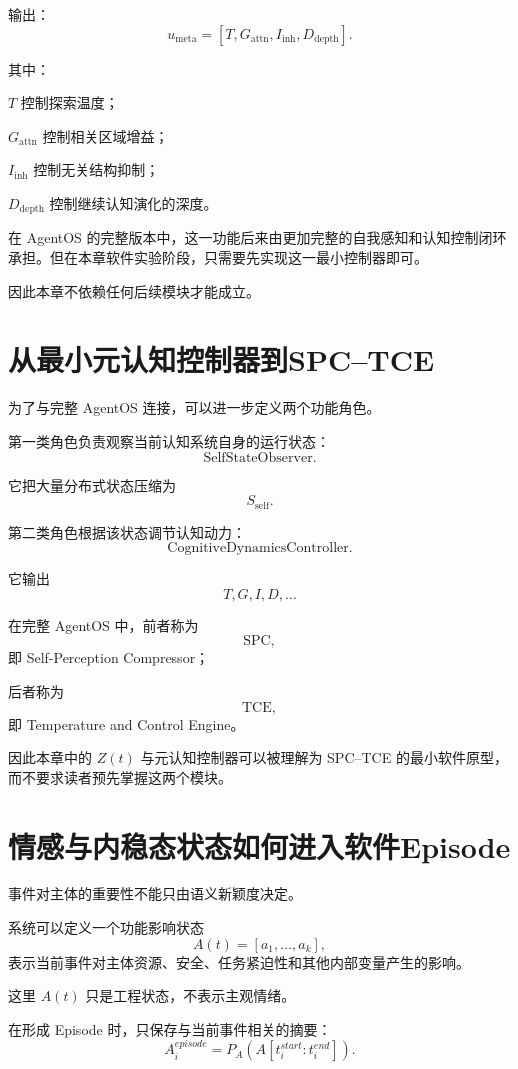 输出：
\[
u_{\mathrm{meta}}
=
[
T,
G_{\mathrm{attn}},
I_{\mathrm{inh}},
D_{\mathrm{depth}}
].
\]

其中：

$T$ 控制探索温度；

$G_{\mathrm{attn}}$ 控制相关区域增益；

$I_{\mathrm{inh}}$ 控制无关结构抑制；

$D_{\mathrm{depth}}$ 控制继续认知演化的深度。

在 AgentOS 的完整版本中，这一功能后来由更加完整的自我感知和认知控制闭环承担。但在本章软件实验阶段，只需要先实现这一最小控制器即可。

因此本章不依赖任何后续模块才能成立。

\section{从最小元认知控制器到SPC--TCE}

为了与完整 AgentOS 连接，可以进一步定义两个功能角色。

第一类角色负责观察当前认知系统自身的运行状态：
\[
\boxed{
\mathrm{SelfStateObserver}.
}
\]

它把大量分布式状态压缩为
\[
S_{\mathrm{self}}.
\]

第二类角色根据该状态调节认知动力：
\[
\boxed{
\mathrm{CognitiveDynamicsController}.
}
\]

它输出
\[
T,
G,
I,
D,
\ldots
\]

在完整 AgentOS 中，前者称为
\[
\mathrm{SPC},
\]
即 Self-Perception Compressor；

后者称为
\[
\mathrm{TCE},
\]
即 Temperature and Control Engine。

因此本章中的 $Z(t)$ 与元认知控制器可以被理解为 SPC--TCE 的最小软件原型，而不要求读者预先掌握这两个模块。

\section{情感与内稳态状态如何进入软件Episode}

事件对主体的重要性不能只由语义新颖度决定。

系统可以定义一个功能影响状态
\[
A(t)
=
[
a_1,\ldots,a_k
],
\]
表示当前事件对主体资源、安全、任务紧迫性和其他内部变量产生的影响。

这里 $A(t)$ 只是工程状态，不表示主观情绪。

在形成 Episode 时，只保存与当前事件相关的摘要：
\[
A_i^{episode}
=
P_A(A[t_i^{start}:t_i^{end}]).
\]

